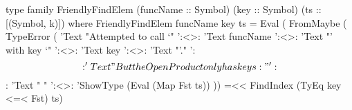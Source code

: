 \begin{code}
type family FriendlyFindElem (funcName :: Symbol)
                             (key :: Symbol)
                             (ts :: [(Symbol, k)]) where
  FriendlyFindElem funcName key ts =
    Eval (
      FromMaybe
           ( TypeError
           ( 'Text "Attempted to call `"
       ':<>: 'Text funcName
       ':<>: 'Text "' with key `"
       ':<>: 'Text key
       ':<>: 'Text "'."
       ':$$: 'Text "But the OpenProduct only has keys :"
       ':$$: 'Text "  "
       ':<>: 'ShowType (Eval (Map Fst ts))
           )) =<< FindIndex (TyEq key <=< Fst) ts)
\end{code}
